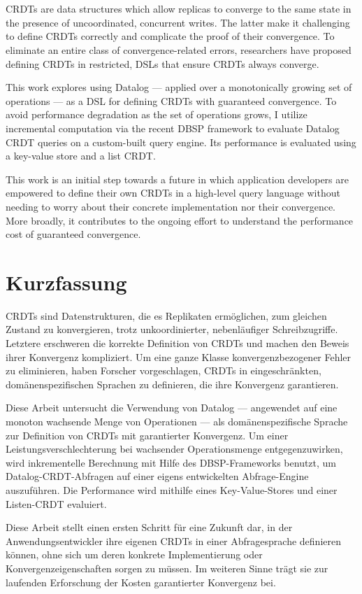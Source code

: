 \chapter{\abstractname}

\acsp{CRDT} are data structures which allow replicas to converge to the same
state in the presence of uncoordinated, concurrent writes.
The latter make it challenging to define \acsp{CRDT} correctly and
complicate the proof of their convergence.
To eliminate an entire class of convergence-related errors,
researchers have proposed defining \acsp{CRDT} in restricted,
\aclp{DSL} that ensure \acsp{CRDT} always converge.

This work explores using Datalog --- applied over a monotonically growing set of
operations --- as a \acl{DSL} for defining \acsp{CRDT} with guaranteed convergence.
To avoid performance degradation as the set of operations grows,
I utilize incremental computation via the recent DBSP framework to evaluate
Datalog \acs{CRDT} queries on a custom-built query engine.
Its performance is evaluated using a key-value store and a list \acs{CRDT}.

This work is an initial step towards a future in which application developers are
empowered to define their own \acsp{CRDT} in a high-level query language without
needing to worry about their concrete implementation nor their convergence.
More broadly, it contributes to the ongoing effort to understand the performance
cost of guaranteed convergence.

\chapter{Kurzfassung}

\acsp{CRDT} sind Datenstrukturen, die es Replikaten ermöglichen, zum gleichen Zustand
zu konvergieren, trotz unkoordinierter, nebenläufiger Schreibzugriffe.
Letztere erschweren die korrekte Definition von \acsp{CRDT} und
machen den Beweis ihrer Konvergenz kompliziert.
Um eine ganze Klasse konvergenzbezogener Fehler zu eliminieren, haben Forscher
vorgeschlagen, \acsp{CRDT} in eingeschränkten, domänenspezifischen Sprachen
zu definieren, die ihre Konvergenz garantieren.

Diese Arbeit untersucht die Verwendung von Datalog --- angewendet auf eine monoton
wachsende Menge von Operationen --- als domänenspezifische Sprache zur Definition
von \acsp{CRDT} mit garantierter Konvergenz.
Um einer Leistungsverschlechterung bei wachsender Operationsmenge entgegenzuwirken,
wird inkrementelle Berechnung mit Hilfe des DBSP-Frameworks benutzt,
um Datalog-\acs{CRDT}-Abfragen auf einer eigens entwickelten Abfrage-Engine auszuführen.
Die Performance wird mithilfe eines Key-Value-Stores und einer Listen-\acs{CRDT} evaluiert.

Diese Arbeit stellt einen ersten Schritt für eine Zukunft dar,
in der Anwendungsentwickler ihre eigenen \acsp{CRDT} in einer Abfragesprache
definieren können, ohne sich um deren konkrete Implementierung oder
Konvergenzeigenschaften sorgen zu müssen.
Im weiteren Sinne trägt sie zur laufenden Erforschung der Kosten garantierter
Konvergenz bei.
